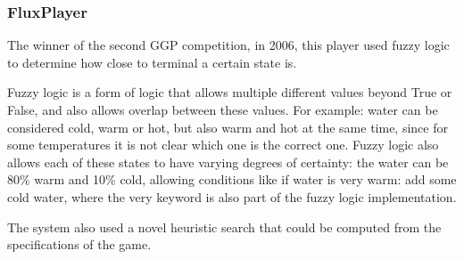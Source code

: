 \subsubsection{FluxPlayer}
The winner of the second GGP competition, in 2006, this player used fuzzy logic to determine how close to terminal a certain state is.

Fuzzy logic is a form of logic that allows multiple different values beyond True or False, and also allows overlap between these values. For example: water can be considered cold, warm or hot, but also warm and hot at the same time, since for some temperatures it is not clear which one is the correct one. Fuzzy logic also allows each of these states to have varying degrees of certainty: the water can be 80\% warm and 10\% cold, allowing conditions like if water is very warm: add some cold water, where the very keyword is also part of the fuzzy logic implementation.

The system also used a novel heuristic search that could be computed from the specifications of the game.